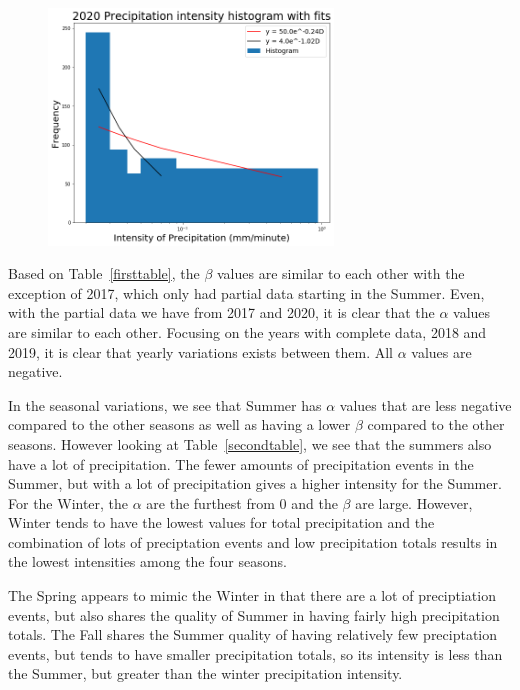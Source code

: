 \documentclass[11pt]{report}
\begin{document}
\begin{figure}[b]
	\centering
	\includegraphics[width=0.675\textwidth]{Figures/inten2020_fit.png}
	\caption[Fitting Intensity histogram for 2020 with different bins]
	{\label{i2020_fit}  }
\end{figure}
\clearpage




Based on Table~\ref{firsttable}, the $\beta$ values are similar to
each other with the exception of 2017, which only had partial data
starting in the Summer. Even, with the partial data we have from 2017
and 2020, it is clear that the $\alpha$ values are similar to each
other. Focusing on the years with complete data, 2018 and 2019, it is
clear that yearly variations exists between them. All $\alpha$ values
are negative.

In the seasonal variations, we see that Summer has $\alpha$ values
that are less negative compared to the other seasons as well as having
a lower $\beta$ compared to the other seasons. However looking at
Table~\ref{secondtable}, we see that the summers also have a lot of
precipitation. The fewer amounts of precipitation events in the
Summer, but with a lot of precipitation gives a higher intensity for
the Summer. For the Winter, the $\alpha$ are the furthest from 0 and
the $\beta$ are large. However, Winter tends to have the lowest values
for total precipitation and the combination of lots of preciptation
events and low precipitation totals results in the lowest intensities
among the four seasons.

The Spring appears to mimic the Winter in that there are a lot of
preciptiation events, but also shares the quality of Summer in having
fairly high precipitation totals. The Fall shares the Summer quality
of having relatively few preciptation events, but tends to have
smaller precipitation totals, so its intensity is less than the
Summer, but greater than the winter precipitation intensity.
 
\end{document}
